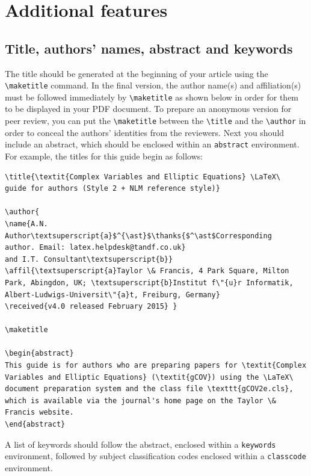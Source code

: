\documentclass{gCOV2e}
\theoremstyle{plain}%
\theoremstyle{definition}
\theoremstyle{remark}
\begin{document}
\section{Additional features}

\subsection{Title, authors' names, abstract and keywords}

The title should be generated at the beginning of your article using the \verb"\maketitle" command.
In the final version, the author name(s) and affiliation(s) must be followed immediately by \verb"\maketitle" as shown below in order for them to be displayed in your PDF document.
To prepare an anonymous version for peer review, you can put the \verb"\maketitle" between the \verb"\title" and the \verb"\author" in order to conceal the authors' identities from the reviewers.
Next you should include an abstract, which should be enclosed within an \texttt{abstract} environment.
For example, the titles for this guide begin as follows:
\begin{verbatim}
\title{\textit{Complex Variables and Elliptic Equations} \LaTeX\
guide for authors (Style 2 + NLM reference style)}

\author{
\name{A.N. Author\textsuperscript{a}$^{\ast}$\thanks{$^\ast$Corresponding
author. Email: latex.helpdesk@tandf.co.uk}
and I.T. Consultant\textsuperscript{b}}
\affil{\textsuperscript{a}Taylor \& Francis, 4 Park Square, Milton
Park, Abingdon, UK; \textsuperscript{b}Institut f\"{u}r Informatik,
Albert-Ludwigs-Universit\"{a}t, Freiburg, Germany}
\received{v4.0 released February 2015} }

\maketitle

\begin{abstract}
This guide is for authors who are preparing papers for \textit{Complex
Variables and Elliptic Equations} (\textit{gCOV}) using the \LaTeX\
document preparation system and the class file \texttt{gCOV2e.cls},
which is available via the journal's home page on the Taylor \&
Francis website.
\end{abstract}
\end{verbatim}
A list of keywords should follow the abstract, enclosed within a \texttt{keywords} environment, followed by subject classification codes enclosed within a \texttt{classcode} environment.
\end{document}

